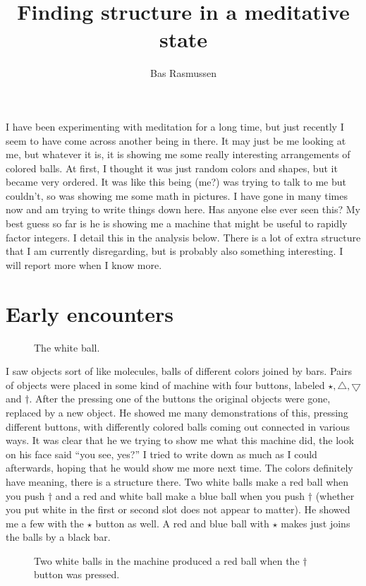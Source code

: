 \documentclass[12pt]{article}
\title{Finding structure in a meditative state}
\author{Bas Rasmussen}
\newcommand{\gcd}{\operatorname{gcd}}
\def\gcd{\bigtriangledown}
\def\lcm{\bigtriangleup}
\begin{document}
\maketitle
I have been experimenting with meditation for a long time, but just recently I seem to have come across another being in there.  It may just be me looking at me, but whatever it is, it is
showing me some really interesting arrangements of colored balls.  At first, I thought it was just random colors and shapes, but it became very ordered.  It was like this being (me?)
was trying to talk to me but couldn't, so was showing me some math in pictures.   I have gone in many times now and am trying to write things down here.  Has anyone else
ever seen this?  My best guess so far is he is showing me a machine that might be useful to rapidly factor integers.  I detail this in the analysis below.  There is a lot of extra structure
that I am currently disregarding, but is probably also something interesting.  I will report more when I know more.

\section{Early encounters}
\begin{figure}
\centering
{}
\caption{The white ball.}
\end{figure}

I saw objects sort of like molecules, balls of different colors joined by bars.   Pairs of objects were placed in
some kind of machine with four buttons, labeled $\star, \lcm, \gcd$ and $\dagger$.  After the pressing one of the buttons the original
objects were gone, replaced by a new object.  He showed me many demonstrations of this, pressing different buttons, with differently colored balls coming out
connected in various ways.  It was clear that he we trying to show me what this machine did, the look on his face said ``you see, yes?''  I tried to write down as much
as I could afterwards, hoping that he would show me more next time.  The colors definitely have meaning, there is a structure there.  Two white balls
make a red ball when you push $\dagger$ and a red and white ball make a blue ball when you push $\dagger$ (whether you put white in the first or second slot
does not appear to matter).  He showed me a few with the $\star$ button as well.  A red and blue ball with $\star$ makes just joins the balls by a black bar.  
\begin{figure}
\centering
{}
\caption{Two white balls in the machine produced a red ball when the $\dagger$ button was pressed.}
\end{figure}
\end{document}

